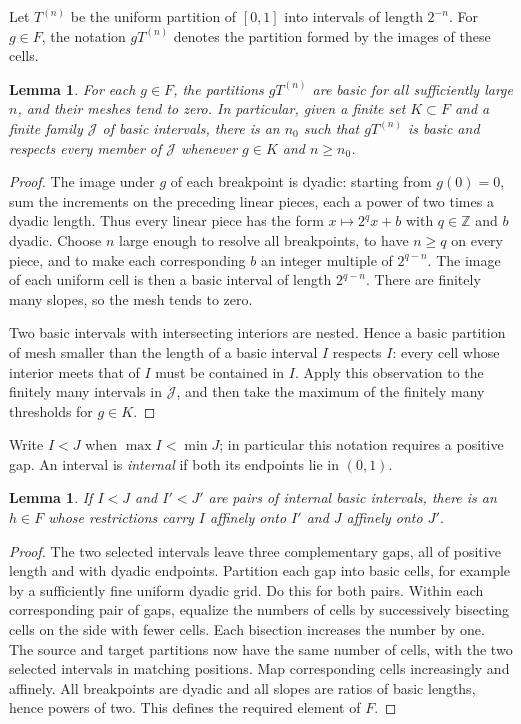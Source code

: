 \documentclass[11pt]{article}
\newtheorem{lemma}[theorem]{Lemma}
\theoremstyle{definition}
\numberwithin{equation}{section}
\begin{document}
Let $T^{(n)}$ be the uniform partition of $[0,1]$ into intervals of
length $2^{-n}$.  For $g\in F$, the notation $gT^{(n)}$ denotes the
partition formed by the images of these cells.

\begin{lemma}\label{dyad:eventual}
For each $g\in F$, the partitions $gT^{(n)}$ are basic for all
sufficiently large $n$, and their meshes tend to zero.  In particular,
given a finite set $K\subset F$ and a finite family $\mathcal J$ of
basic intervals, there is an $n_0$ such that $gT^{(n)}$ is basic and
respects every member of $\mathcal J$ whenever $g\in K$ and $n\geq n_0$.
\end{lemma}

\begin{proof}
The image under $g$ of each breakpoint is dyadic: starting from
$g(0)=0$, sum the increments on the preceding linear pieces, each a
power of two times a dyadic length.  Thus every linear piece has the
form $x\mapsto 2^q x+b$ with $q\in\mathbb Z$ and $b$ dyadic.  Choose
$n$ large enough to resolve all breakpoints, to have $n\geq q$ on
every piece, and to make each corresponding $b$ an integer multiple
of $2^{q-n}$.  The image of each uniform cell is then a basic interval
of length $2^{q-n}$.  There are finitely many slopes, so the mesh tends
to zero.

Two basic intervals with intersecting interiors are nested.  Hence
a basic partition of mesh smaller than the length of a basic
interval $I$ respects $I$: every cell whose interior meets that of
$I$ must be contained in $I$.  Apply this observation to the
finitely many intervals in $\mathcal J$, and then take the maximum
of the finitely many thresholds for $g\in K$.
\end{proof}

Write $I<J$ when $\max I<\min J$; in particular this notation requires
a positive gap.  An interval is \emph{internal} if both its endpoints
lie in $(0,1)$.

\begin{lemma}\label{dyad:transport}
If $I<J$ and $I'<J'$ are pairs of internal basic intervals, there is
an $h\in F$ whose restrictions carry $I$ affinely onto $I'$ and $J$
affinely onto $J'$.
\end{lemma}

\begin{proof}
The two selected intervals leave three complementary gaps, all of
positive length and with dyadic endpoints.  Partition each gap into
basic cells, for example by a sufficiently fine uniform dyadic
grid.  Do this for both pairs.  Within each corresponding pair of
gaps, equalize the numbers of cells by successively bisecting cells
on the side with fewer cells.  Each bisection increases the number
by one.  The source and target partitions now have the same number
of cells, with the two selected intervals in matching positions.
Map corresponding cells increasingly and affinely.  All
breakpoints are dyadic and all slopes are ratios of basic lengths,
hence powers of two.  This defines the required element of $F$.
\end{proof}
\end{document}
